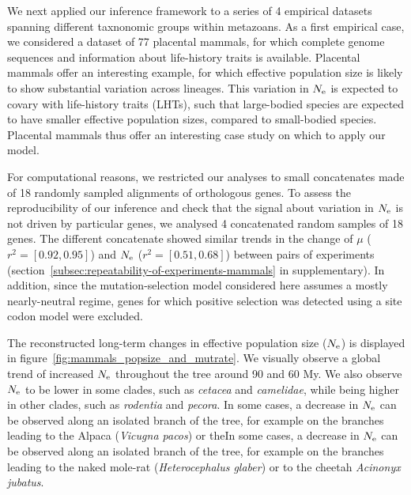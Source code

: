 We next applied our inference framework to a series of 4 empirical datasets spanning different taxnonomic groups within metazoans.
As a first empirical case, we considered a dataset of 77 placental mammals, for which complete genome sequences and information about life-history traits is available.
Placental mammals offer an interesting example, for which effective population size is likely to show substantial variation across lineages.
This variation in $N_{\text{e}}$ is expected to covary with life-history traits (LHTs), such that large-bodied species are expected to have smaller effective population sizes, compared to small-bodied species.
Placental mammals thus offer an interesting case study on which to apply our model.

For computational reasons, we restricted our analyses to small concatenates made of 18 randomly sampled alignments of orthologous genes.
To assess the reproducibility of our inference and check that the signal about variation in $N_{\text{e}}$ is not driven by particular genes, we analysed 4 concatenated random samples of 18 genes.
The different concatenate showed similar trends in the change of $\mu$ ($r^2=[0.92,0.95]$) and $N_{\text{e}}$ ($r^2=[0.51,0.68]$) between pairs of experiments (section~\ref{subsec:repeatability-of-experiments-mammals} in supplementary).
In addition, since the mutation-selection model considered here assumes a mostly nearly-neutral regime, genes for which positive selection was detected using a site codon model were excluded.

The reconstructed long-term changes in effective population size ($N_{\text{e}}$) is displayed in figure~\ref{fig:mammals_popsize_and_mutrate}.
We visually observe a global trend of increased $N_{\text{e}}$ throughout the tree around 90 and 60 My.
We also observe $N_{\text{e}}$ to be lower in some clades, such as \textit{cetacea} and \textit{camelidae}, while being higher in other clades, such as \textit{rodentia} and \textit{pecora}.
In some cases, a decrease in $N_{\text{e}}$ can be observed along an isolated branch of the tree, for example on the branches leading to the Alpaca (\textit{Vicugna pacos}) or theIn some cases, a decrease in $N_{\text{e}}$ can be observed along an isolated branch of the tree, for example on the branches leading to the naked mole-rat (\textit{Heterocephalus glaber}) or to the cheetah \textit{Acinonyx jubatus}.

